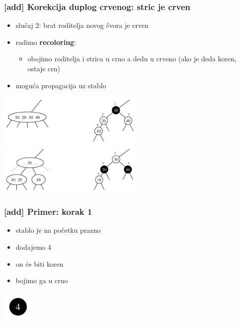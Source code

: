 \documentclass[compress]{beamer}
\begin{document}
\begin{frame}[fragile]
  \frametitle{[add] Korekcija duplog crvenog: stric je crven}
  \begin{itemize}
    \item slučaj 2: brat roditelja novog čvora je crven
    \item radimo \textbf{recoloring}:
    \begin{itemize}
      \item obojimo roditelja i strica u crno a dedu u crveno (ako je deda koren, ostaje crn)
    \end{itemize}
    \item moguća propagacija uz stablo
  \end{itemize}
  \includegraphics[width=7cm]{asp-11-pic40a.pdf} \\
  \includegraphics[width=7cm]{asp-11-pic40b.pdf}
\end{frame}

\begin{frame}[fragile]
  \frametitle{[add] Primer: korak 1}
  \begin{itemize}
    \item stablo je na početku prazno
    \item dodajemo 4
    \item on će biti koren
    \item bojimo ga u crno
  \end{itemize}
  \begin{center}
    \includegraphics[scale=1.0]{asp-11-add-01.pdf}
  \end{center}
\end{frame}
\end{document}
